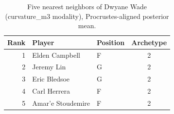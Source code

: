 \begin{table}[htbp]
  \centering\small
  \begin{tabular}{rllc}
    \toprule
    Rank & Player & Position & Archetype \\
    \midrule
    1 & Elden Campbell & F & 2 \\
    2 & Jeremy Lin & G & 2 \\
    3 & Eric Bledsoe & G & 2 \\
    4 & Carl Herrera & F & 2 \\
    5 & Amar'e Stoudemire & F & 2 \\
    \bottomrule
  \end{tabular}
  \caption{Five nearest neighbors of Dwyane Wade (curvature_m3 modality), Procrustes-aligned posterior mean.}
  \label{tab:Dwyane_Wade_neighbors_curvature_m3}
\end{table}

